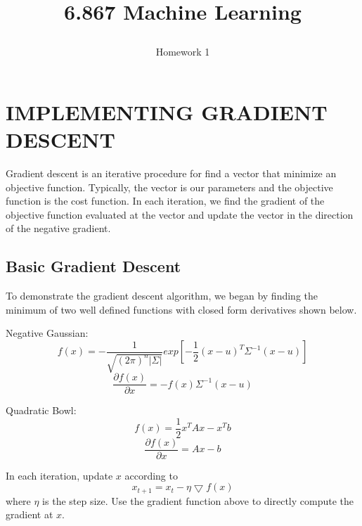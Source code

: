\documentclass[a4paper,twoside]{article}
\begin{document}
\title{6.867 Machine Learning  \subtitle{Homework 1} }

\maketitle


\section{\uppercase{Implementing Gradient Descent}}

\noindent Gradient descent is an iterative procedure for find a vector that minimize an objective function. Typically, the vector is our parameters and the objective function is the cost function. In each iteration, we find the gradient of the objective function evaluated at the vector and update the vector in the direction of the negative gradient.

\subsection{Basic Gradient Descent}

\noindent To demonstrate the gradient descent algorithm, we began by finding the minimum of two well defined functions with closed form derivatives shown below.

\medskip
\noindent Negative Gaussian:
\begin{equation}
f(x) = - \frac{1}{\sqrt{(2\pi)^n |\Sigma|}} exp[-\frac{1}{2} (x-u)^T\Sigma^{-1}(x-u)]
\end{equation}
\begin{equation}
\frac{\partial f(x)}{\partial x} = -f(x) \Sigma^{-1} (x-u)
\end{equation}

\noindent Quadratic Bowl:
\begin{equation}
f(x) = \frac{1}{2} x^T A x - x^T b
\end{equation}
\begin{equation}
\frac{\partial f(x)}{\partial x} = Ax - b
\end{equation}

\noindent In each iteration, update $x$ according to 
\begin{equation}
x_{t+1} = x_{t} - \eta \bigtriangledown f(x)
\end{equation}
where $\eta$ is the step size. Use the gradient function above to directly compute the gradient at $x$.
\end{document}
